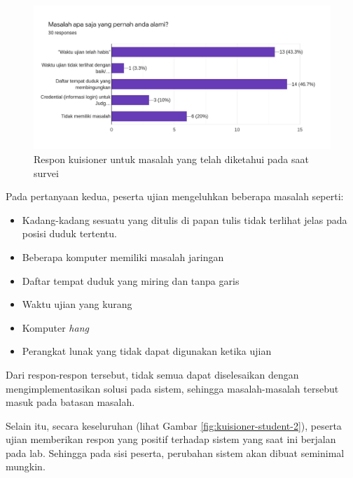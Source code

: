     \begin{figure}
        \centering
        \includegraphics[width=0.7\paperwidth]{Gambar/survey-student.pdf}
        \caption{Respon kuisioner untuk masalah yang telah diketahui pada saat survei}
        \label{fig:kuisioner-student-1}
    \end{figure}
    
    Pada pertanyaan kedua, peserta ujian mengeluhkan beberapa masalah seperti:
    \begin{itemize}
        \item Kadang-kadang sesuatu yang ditulis di papan tulis tidak terlihat jelas pada posisi duduk tertentu.
        
        \item Beberapa komputer memiliki masalah jaringan
        
        \item Daftar tempat duduk yang miring dan tanpa garis
        
        \item Waktu ujian yang kurang
        
        \item Komputer \textit{hang}
        
        \item Perangkat lunak yang tidak dapat digunakan ketika ujian
    \end{itemize}
    Dari respon-respon tersebut, tidak semua dapat diselesaikan dengan mengimplementasikan solusi pada sistem, sehingga masalah-masalah tersebut masuk pada batasan masalah.
    
    Selain itu, secara keseluruhan (lihat Gambar \ref{fig:kuisioner-student-2}), peserta ujian memberikan respon yang positif terhadap sistem yang saat ini berjalan pada lab. Sehingga pada sisi peserta, perubahan sistem akan dibuat seminimal mungkin.
    
